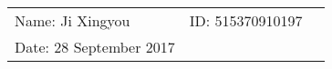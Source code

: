 \documentclass{article}
\begin{document}
\begin{spacing}{2}

\vspace*{0.25cm}

\hrulefill

\thispagestyle{empty}

\begin{center}
\begin{large}
\end{large}

\hrulefill

\vspace*{5cm}
\begin{Large}
\end{Large}

\vspace{2em}

\begin{large}
\end{large}
\end{center}


\vfill

\begin{table}[h!]
\flushleft
\begin{tabular}{lll}
Name: Ji Xingyou \hspace*{2em}&
ID: 515370910197\hspace*{2em}
\\

Date: 28 September 2017

\end{tabular}
\end{table}

\hfill
\newpage
\tableofcontents
\newpage

\end{spacing}
\end{document}
